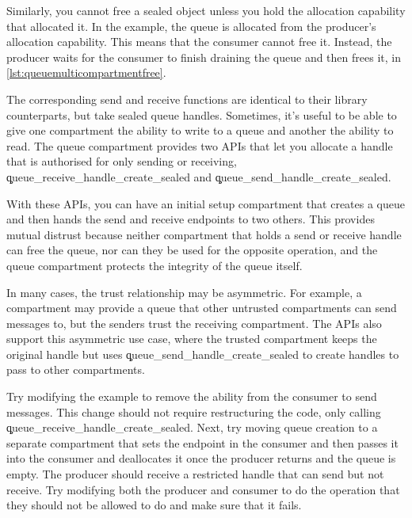 Similarly, you cannot free a sealed object unless you hold the allocation capability that allocated it.
In the example, the queue is allocated from the producer's allocation capability.
This means that the consumer cannot free it.
Instead, the producer waits for the consumer to finish draining the queue and then frees it, in \ref{lst:queuemulticompartmentfree}.

\codelisting[filename=examples/producer_consumer_compartment/producer.cc,marker=queue_cleanup,label=lst:queuemulticompartmentfree,caption="Freeing a message queue once it is empty."]{}


The corresponding send and receive functions are identical to their library counterparts, but take sealed queue handles.
Sometimes, it's useful to be able to give one compartment the ability to write to a queue and another the ability to read.
The queue compartment provides two APIs that let you allocate a handle that is authorised for only sending or receiving, \c{queue_receive_handle_create_sealed} and \c{queue_send_handle_create_sealed}.



With these APIs, you can have an initial setup compartment that creates a queue and then hands the send and receive endpoints to two others.
This provides mutual distrust because neither compartment that holds a send or receive handle can free the queue, nor can they be used for the opposite operation, and the queue compartment protects the integrity of the queue itself.

In many cases, the trust relationship may be asymmetric.
For example, a compartment may provide a queue that other untrusted compartments can send messages to, but the senders trust the receiving compartment.
The APIs also support this asymmetric use case, where the trusted compartment keeps the original handle but uses \c{queue_send_handle_create_sealed} to create handles to pass to other compartments.

Try modifying the example to remove the ability from the consumer to send messages.
This change should not require restructuring the code, only calling \c{queue_receive_handle_create_sealed}.
Next, try moving queue creation to a separate compartment that sets the endpoint in the consumer and then passes it into the consumer and deallocates it once the producer returns and the queue is empty.
The producer should receive a restricted handle that can send but not receive.
Try modifying both the producer and consumer to do the operation that they should not be allowed to do and make sure that it fails.


